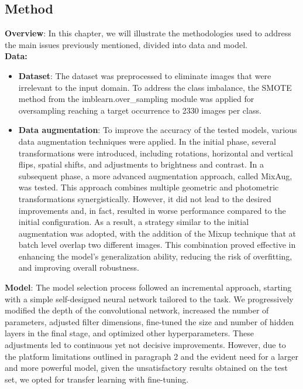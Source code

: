 \documentclass[11pt]{article}
\begin{document}
\begin{multicols}{2}
        
       

        \section{Method}
        
        \textbf{Overview}: In this chapter, we will illustrate the methodologies used to address the main issues previously mentioned, divided into data and model. \\
        
        \noindent \textbf{Data:}
        \begin{itemize}
            \item \textbf{Dataset}: The dataset was preprocessed to eliminate images that were irrelevant to the input domain. To address the class imbalance, the SMOTE method from the imblearn.over\_sampling module was applied for oversampling reaching a target occurrence to 2330 images per class.
            \item \textbf{Data augmentation}: To improve the accuracy of the tested models, various data augmentation techniques were applied. In the initial phase, several transformations were introduced, including rotations, horizontal and vertical flips, spatial shifts, and adjustments to brightness and contrast. In a subsequent phase, a more advanced augmentation approach, called MixAug, was tested. This approach combines multiple geometric and photometric transformations synergistically. However, it did not lead to the desired improvements and, in fact, resulted in worse performance compared to the initial configuration.
            As a result, a strategy similar to the initial augmentation was adopted, with the addition of the Mixup technique that at batch level overlap two different images. This combination proved effective in enhancing the model's generalization ability, reducing the risk of overfitting, and improving overall robustness.
        \end{itemize}
        
        \noindent \textbf{Model}:
        The model selection process followed an incremental approach, starting with a simple self-designed neural network tailored to the task. We progressively modified the depth of the convolutional network, increased the number of parameters, adjusted filter dimensions, fine-tuned the size and number of hidden layers in the final stage, and optimized other hyperparameters. These adjustments led to continuous yet not decisive improvements. However, due to the platform limitations outlined in paragraph 2 and the evident need for a larger and more powerful model, given the unsatisfactory results obtained on the test set, we opted for transfer learning with fine-tuning.
        

\end{multicols}
\end{document}
